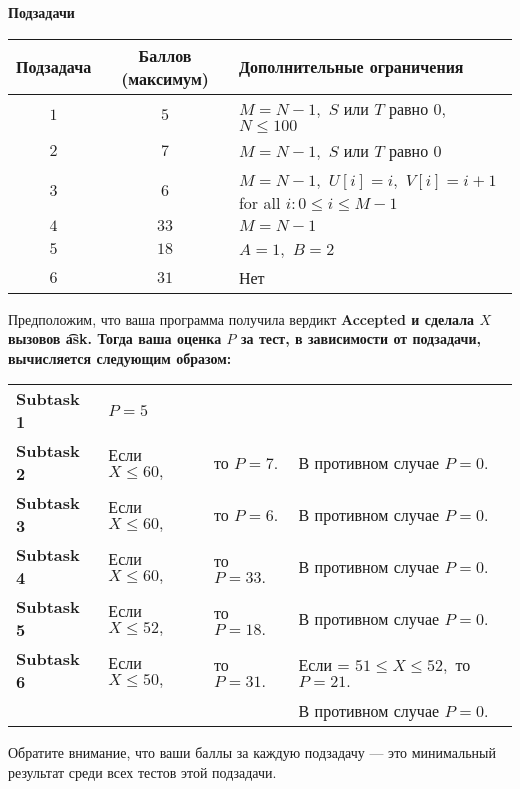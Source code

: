 \bf{Подзадачи}

\begin{tabular}{|c|c|l|}\hline
\bf{Подзадача}&\bf{Баллов (максимум)}&\bf{Дополнительные ограничения}  \\\hline
$1$&$5$&$M=N-1,$ $S$ или $T$ равно  $0,$ $N \le 100$ \\\hline
$2$&$7$&$M=N-1,$ $S$ или $T$ равно  $0$ \\\hline
$3$&$6$&$M=N-1,$ $U[i] = i,$ $V[i] = i+1$ for all $i: 0\le i \le M-1$ \\\hline
$4$&$33$&$M=N-1$ \\\hline
$5$&$18$&$A=1,$ $B=2$ \\\hline
$6$&$31$&Нет \\\hline
\end{tabular}

Предположим, что ваша программа получила вердикт \bf{Accepted} и сделала $X$ вызовов \t{ask}. Тогда ваша оценка $P$ за тест, в зависимости от подзадачи, вычисляется следующим образом:

\begin{tabular}{llll}
\bf{Subtask 1}&$P=5$&&\\
\bf{Subtask 2}&Если $X \le 60,$ &то $P=7.$&В противном случае $P=0.$ \\
\bf{Subtask 3}&Если $X \le 60,$&то $P=6.$&В противном случае $P=0.$ \\
\bf{Subtask 4}&Если $X \le 60,$&то $P=33.$&В противном случае $P=0.$ \\
\bf{Subtask 5}&Если $X \le 52,$&то $P=18.$&В противном случае $P=0.$ \\
\bf{Subtask 6}&Если $X \le 50,$&то $P=31.$&Если = $51\le X\le 52,$ то $P=21.$ \\
&&& В противном случае $P=0.$ \\
\end{tabular}

Обратите внимание, что ваши баллы за каждую подзадачу --- это минимальный результат среди всех тестов этой подзадачи.
